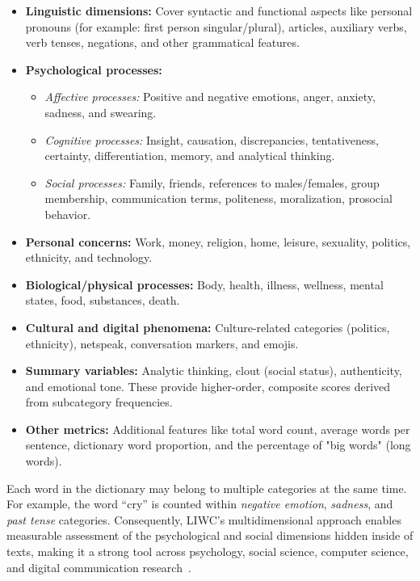 \begin{itemize}
    \item \textbf{Linguistic dimensions:} Cover syntactic and functional aspects like personal pronouns (for example: first person singular/plural), articles, auxiliary verbs, verb tenses, negations, and other grammatical features.
    \item \textbf{Psychological processes:}
        \begin{itemize}
            \item \textit{Affective processes:} Positive and negative emotions, anger, anxiety, sadness, and swearing.
            \item \textit{Cognitive processes:} Insight, causation, discrepancies, tentativeness, certainty, differentiation, memory, and analytical thinking.
            \item \textit{Social processes:} Family, friends, references to males/females, group membership, communication terms, politeness, moralization, prosocial behavior.
        \end{itemize}
    \item \textbf{Personal concerns:} Work, money, religion, home, leisure, sexuality, politics, ethnicity, and technology.
    \item \textbf{Biological/physical processes:} Body, health, illness, wellness, mental states, food, substances, death.
    \item \textbf{Cultural and digital phenomena:} Culture-related categories (politics, ethnicity), netspeak, conversation markers, and emojis.
    \item \textbf{Summary variables:} Analytic thinking, clout (social status), authenticity, and emotional tone. These provide higher-order, composite scores derived from subcategory frequencies.
    \item \textbf{Other metrics:} Additional features like total word count, average words per sentence, dictionary word proportion, and the percentage of "big words" (long words).
\end{itemize}

Each word in the dictionary may belong to multiple categories at the same time. For example, the word ``cry'' is counted within \textit{negative emotion}, \textit{sadness}, and \textit{past tense} categories. Consequently,  LIWC's multidimensional approach enables measurable assessment of the psychological and social dimensions hidden inside of texts, making it a strong tool across psychology, social science, computer science, and digital communication research~\cite{pennebaker2022liwc}.

